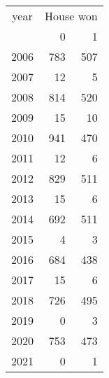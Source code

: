 \footnotesize\begin{tabular}[t]{lrr}
\toprule
\multicolumn{1}{c}{year} & \multicolumn{2}{c}{House won} \\
\cmidrule(l{3pt}r{3pt}){1-1} \cmidrule(l{3pt}r{3pt}){2-3}
  & 0 & 1\\
\midrule
2006 & 783 & 507\\
2007 & 12 & 5\\
2008 & 814 & 520\\
2009 & 15 & 10\\
2010 & 941 & 470\\
2011 & 12 & 6\\
2012 & 829 & 511\\
2013 & 15 & 6\\
2014 & 692 & 511\\
2015 & 4 & 3\\
2016 & 684 & 438\\
2017 & 15 & 6\\
2018 & 726 & 495\\
2019 & 0 & 3\\
2020 & 753 & 473\\
2021 & 0 & 1\\
\bottomrule
\end{tabular}
